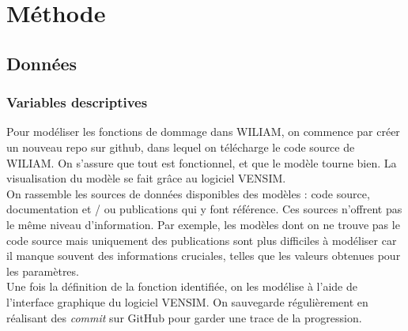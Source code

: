 

\section{Méthode}

\subsection{Données}

\subsubsection{Variables descriptives}


\begin{methodbox}

Pour modéliser les fonctions de dommage dans WILIAM, on commence par créer un nouveau repo sur github, dans lequel on télécharge le code source de WILIAM. On s'assure que tout est fonctionnel, et que le modèle tourne bien. La visualisation du modèle se fait grâce au logiciel VENSIM. \\

On rassemble les sources de données disponibles des modèles : code source, documentation et / ou publications qui y font référence. Ces sources n'offrent pas le même niveau d'information. Par exemple, les modèles dont on ne trouve pas le code source mais uniquement des publications sont plus difficiles à modéliser car il manque souvent des informations cruciales, telles que les valeurs obtenues pour les paramètres. \\

Une fois la définition de la fonction identifiée, on les modélise à l'aide de l'interface graphique du logiciel VENSIM. On sauvegarde régulièrement en réalisant des \textit{commit} sur GitHub pour garder une trace de la progression.
    
\end{methodbox}

